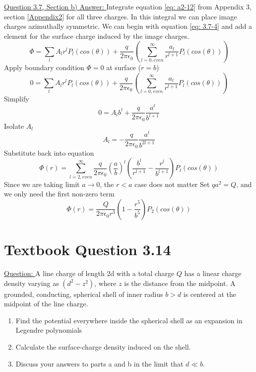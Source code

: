 \documentclass[12pt]{article}
\begin{document}
    \underline{Question 3.7, Section b) Answer: }
    Integrate equation \ref{eq: a2-12} from Appendix 3, section \ref{Appendix2} for all three charges. In this integral we can place image charges azimuthally symmetric. We can begin with equation \ref{eq: 3.7-4} and add a element for the surface charge induced by the image charges.
    \begin{equation} \label{eq: 3.7-10}
        \Phi = \sum_l A_l r^l P_l(cos(\theta)) + \frac{q}{2 \pi \epsilon_0} \left(\sum_{l=0, even}^\infty \frac{a_l}{r^{l+1}} P_l(cos(\theta)) \right)
    \end{equation}
    Apply boundary condition $\Phi=0$ at surface ($r=b$)
    \begin{equation} \label{eq: 3.7-11}
        0 = \sum_l A_l r^l P_l(cos(\theta)) + \frac{q}{2 \pi \epsilon_0} \left(\sum_{l=0, even}^\infty \frac{a_l}{r^{l+1}} P_l(cos(\theta)) \right)
    \end{equation}
    Simplify
    \begin{equation} \label{eq: 3.7-12}
        0 =  A_l b^l + \frac{q}{2 \pi \epsilon_0} \frac{a^l}{b^{l+1}}
    \end{equation}
    Isolate $A_l$
    \begin{equation} \label{eq: 3.7-13}
        A_l =  -\frac{q}{2 \pi \epsilon_0} \frac{a^l}{b^{2l+1}}
    \end{equation}
    Substitute back into equation
    \begin{equation} \label{eq: 3.7-14}
        \Phi(r) = \sum_{l=2, even}^\infty \frac{q}{2 \pi \epsilon_0} \left(\frac{a}{b} \right)^l \left(\frac{b^l}{r^{l+1}} - \frac{r^l}{b^{l+1}} \right) P_l(cos(\theta))
    \end{equation}
    Since we are taking limit $a \rightarrow{} 0$, the $r<a$ case does not matter
    \newline Set $qa^2 = Q$, and we only need the first non-zero term
    \begin{equation} \label{eq: 3.7-15}
        \Phi(r) = \frac{Q}{2 \pi \epsilon_0 r^3} \left(1-\frac{r^5}{b^5} \right) P_2(cos(\theta))
    \end{equation}
    
    
\newpage
\section{Textbook Question 3.14} \label{section3}
    \underline{Question: }
    A line charge of length 2d with a total charge $Q$ has a linear charge density varying as $(d^2 - z^2)$, where $z$ is the distance from the midpoint. A grounded, conducting, spherical shell of inner radius $b>d$ is centered at the midpoint of the line charge. 
    \begin{enumerate}
        \item [a)] Find the potential everywhere inside the spherical shell as an expansion in Legendre polynomials 
        \item [b)] Calculate the surface-charge density induced on the shell.
        \item [c)] Discuss your answers to parts a and b in the limit that $d \ll b$.
    \end{enumerate}
\end{document}
